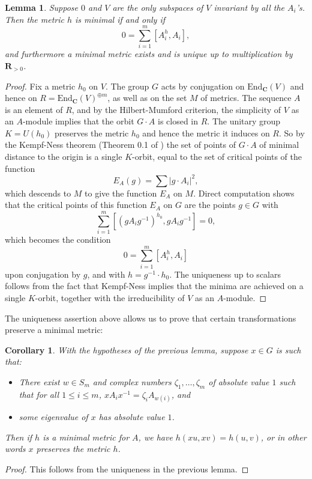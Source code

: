 \documentclass[12pt, reqno]{amsart}
\numberwithin{equation}{section}
\theoremstyle{definition}
\theoremstyle{plain}
\newtheorem{corollary}[theorem]{Corollary}
\newtheorem{lemma}[theorem]{Lemma}
\newcommand{\CC}{\mathbf{C}}
\newcommand{\RR}{\mathbf{R}}
\begin{document}
\begin{lemma} \label{minimal metric}
Suppose $0$ and $V$ are the only subspaces of $V$ invariant by all the $A_i$'s. Then the metric $h$ is minimal if and only if 
$$0=\sum_{i=1}^m [A_i^h,A_i],$$ and furthermore a minimal metric exists and is unique up to multiplication by $\RR_{>0}$. 
\end{lemma}
\begin{proof}
Fix a metric $h_0$ on $V$. The group $G$ acts by conjugation on $\mathrm{End}_\CC(V)$ and hence on $R=\mathrm{End}_\CC(V)^{\oplus m}$, as well as on the set $M$ of metrics. The sequence $A$ is an element of $R$, and by the Hilbert-Mumford criterion, the simplicity of $V$ as an $A$-module implies that the orbit $G \cdot A$ is closed in $R$. The unitary group $K=U(h_0)$ preserves the metric $h_0$ and hence the metric it induces on $R$. So by the Kempf-Ness theorem (Theorem 0.1 of \cite{KeNe}) the set of points of $G\cdot A$ of minimal distance to the origin is a single $K$-orbit, equal to the set of critical points of the function
$$E_A(g)=\sum \left| g\cdot A_i \right|^2,$$ which descends to $M$ to give the function $E_A$ on $M$. Direct computation shows that the critical points of this function $E_A$ on $G$ are the points $g \in G$ with
$$\sum_{i=1}^m [(g A_i g^{-1})^{h_0}, g A_i g^{-1}]=0,$$ which becomes the condition 
$$0=\sum_{i=1}^m [A_i^h,A_i]$$ upon conjugation by $g$, and with $h=g^{-1} \cdot h_0$. The uniqueness up to scalars follows from the fact that Kempf-Ness implies that the minima are achieved on a single $K$-orbit, together with the irreducibility of $V$ as an $A$-module.
\end{proof}

The uniqueness assertion above allows us to prove that certain transformations preserve a minimal metric:\begin{corollary} \label{inv metric}
With the hypotheses of the previous lemma, suppose $x \in G$ is such that:
\begin{itemize}
 \item[(a)] There exist $w \in S_m$ and complex numbers $\zeta_1,\dots,\zeta_m$ of absolute value $1$ such that for all $1 \leq i \leq m$,  $x A_i x^{-1}=\zeta_i A_{w(i)}$, and
 \item[(b)] some eigenvalue of $x$ has absolute value $1$.
 \end{itemize} Then if $h$ is a minimal metric for $A$, we have $h(xu,xv)=h(u,v)$, or in other words $x$ preserves the metric $h$.
\end{corollary}
\begin{proof}
This follows from the uniqueness in the previous lemma.
\end{proof}
\end{document}
